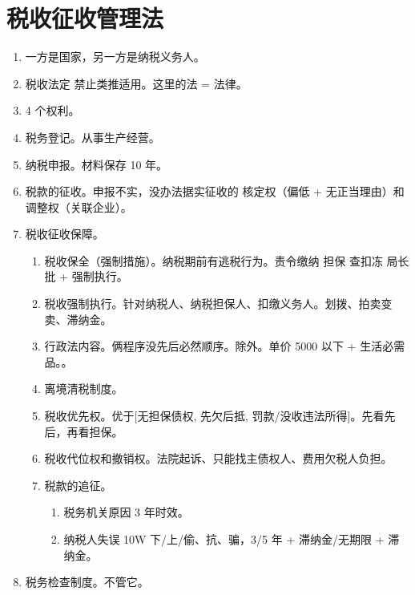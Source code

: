 \section{税收征收管理法}
\begin{enumerate}
  \item 一方是国家，另一方是纳税义务人。
  \item 税收法定 \yjt 禁止类推适用。这里的法 = 法律。
  \item 4 个权利。
  \item 税务登记。从事生产经营。
  \item 纳税申报。材料保存 10 年。
  \item 税款的征收。申报不实，没办法据实征收的 \yjt 核定权（偏低 + 无正当理由）和调整权（关联企业）。
  \item 税收征收保障。
        \begin{enumerate}
          \item 税收保全（强制措施）。纳税期前有逃税行为。责令缴纳 \yjt 担保 \yjt 查扣冻 \yjt 局长批 + 强制执行。
          \item 税收强制执行。针对纳税人、纳税担保人、扣缴义务人。划拨、拍卖变卖、滞纳金。
          \item \sjt 行政法内容。俩程序没先后必然顺序。除外。单价 5000 以下 + 生活必需品。。
          \item 离境清税制度。
          \item 税收优先权。优于[无担保债权, 先欠后抵, 罚款/没收违法所得]。先看先后，再看担保。
          \item 税收代位权和撤销权。法院起诉、只能找主债权人、费用欠税人负担。
          \item 税款的追征。
                \begin{enumerate}
                  \item 税务机关原因 3 年时效。
                  \item 纳税人失误 10W 下/上/偷、抗、骗，3/5 年 + 滞纳金/无期限 + 滞纳金。
                \end{enumerate}
        \end{enumerate}
  \item 税务检查制度。不管它。
\end{enumerate}
